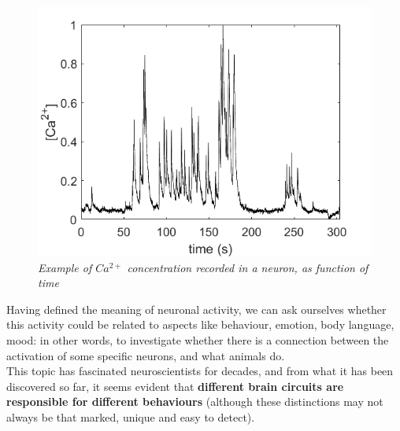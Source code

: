 \documentclass[a4paper]{article}
\begin{document}
\begin{figure}[H]
	\begin{center}
		\includegraphics[scale=.50]{Ca_conc.png} 
	\end{center} 
	\caption{\textit{Example of $Ca^{2+}$ concentration recorded in a neuron, as function of time}}
		
	\end{figure}
	
	Having defined the meaning of neuronal activity, we can ask ourselves whether this activity could be related to aspects like behaviour, emotion, body language, mood: in other words, to investigate whether there is a connection between the activation of some specific neurons, and what animals do.\\
	This topic has fascinated neuroscientists for decades, and from what it has been discovered so far, it seems evident that \textbf{different brain circuits are responsible for different behaviours} (although these distinctions may not always be that marked, unique and easy to detect).
\end{document}
